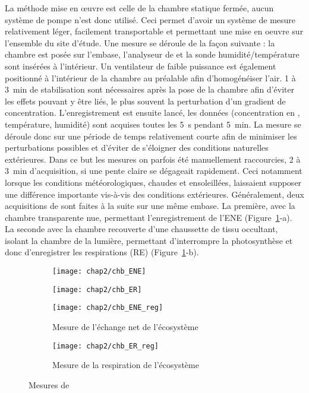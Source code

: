 La méthode mise en œuvre est celle de la chambre statique fermée, aucun système de pompe n'est donc utilisé.
Ceci permet d'avoir un système de mesure relativement léger, facilement transportable et permettant une mise en oeuvre sur l'ensemble du site d'étude.
Une mesure se déroule de la façon suivante :
la chambre est posée sur l'embase, l'analyseur de \coo et la sonde humidité/température sont insérées à l'intérieur.
Un ventilateur de faible puissance est également positionné à l'intérieur de la chambre au préalable afin d'homogénéiser l'air.
1 à \SI{3}{\minute} de stabilisation sont nécessaires après la pose de la chambre afin d'éviter les effets pouvant y être liés, le plus souvent la perturbation d'un gradient de concentration.
L’enregistrement est ensuite lancé, les données (concentration en \coo, température, humidité) sont acquises toutes les \SI{5}{\second} pendant \SI{5}{\minute}.
La mesure se déroule donc sur une période de temps relativement courte afin de minimiser les perturbations possibles et d'éviter de s'éloigner des conditions naturelles extérieures.
Dans ce but les mesures on parfois été manuellement raccourcies, 2 à \SI{3}{\minute} d'acquisition, si une pente claire se dégageait rapidement.
Ceci notamment lorsque les conditions météorologiques, chaudes et ensoleillées, laissaient supposer une différence importante vis-à-vis des conditions extérieures.
Généralement, deux acquisitions de \coo sont faites à la suite sur une même embase.
La première, avec la chambre transparente nue, permettant l'enregistrement de l'ENE (Figure~\ref{fig:chb}-a).
La seconde avec la chambre recouverte d'une chaussette de tissu occultant, isolant la chambre de la lumière, permettant d'interrompre la photosynthèse et donc d'enregistrer les respirations (RE) (Figure~\ref{fig:chb}-b).

\begin{figure}
	\centering
	\begin{subfigure}[t]{0.5\textwidth}
		\centering
		\texttt{[image: chap2/chb\_ENE]}
	\end{subfigure}%
	\begin{subfigure}[t]{0.5\textwidth}
		\centering
		\texttt{[image: chap2/chb\_ER]}
	\end{subfigure}%

	\begin{subfigure}[t]{0.5\textwidth}
		\texttt{[image: chap2/chb\_ENE\_reg]}
		\caption{Mesure de l'échange net de l'écosystème}
	\end{subfigure}%
	\begin{subfigure}[t]{0.5\textwidth}
		\texttt{[image: chap2/chb\_ER\_reg]}
		\caption{Mesure de la respiration de l'écosystème}
	\end{subfigure}
\caption{Mesures de \coo}
\label{fig:chb}
\end{figure}


